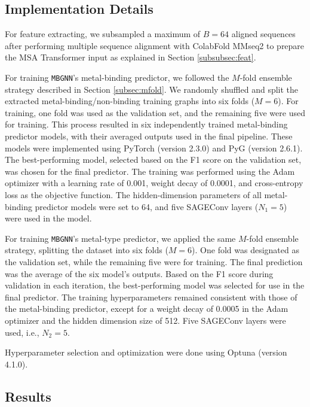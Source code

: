 \documentclass[letterpaper, 10 pt, conference]{ieeeconf}
\begin{document}
\subsection{Implementation Details}
For feature extracting, we subsampled a maximum of $B=64$ aligned sequences after performing multiple sequence alignment with ColabFold MMseq2 to prepare the MSA Transformer input as explained in Section \ref{subsubsec:feat}.

For training \texttt{MBGNN}’s metal-binding predictor, we followed the $M$-fold ensemble strategy described in Section \ref{subsec:mfold}. We randomly shuffled and split the extracted metal-binding/non-binding training graphs into six folds ($M=6$). For training, one fold was used as the validation set, and the remaining five were used for training. This process resulted in six independently trained metal-binding predictor models, with their averaged outputs used in the final pipeline. These models were implemented using PyTorch (version 2.3.0)\cite{10.5555/3454287.3455008} and PyG (version 2.6.1)\cite{fey2019fast}. The best-performing model, selected based on the F1 score on the validation set, was chosen for the final predictor. The training was performed using the Adam optimizer with a learning rate of 0.001, weight decay of 0.0001, and cross-entropy loss as the objective function. The hidden-dimension parameters of all metal-binding predictor models were set to 64, and five SAGEConv layers ($N_1=5$) were used in the model.

For training \texttt{MBGNN}’s metal-type predictor, we applied the same $M$-fold ensemble strategy, splitting the dataset into six folds ($M=6$). One fold was designated as the validation set, while the remaining five were for training. The final prediction was the average of the six model's outputs. Based on the F1 score during validation in each iteration, the best-performing model was selected for use in the final predictor. The training hyperparameters remained consistent with those of the metal-binding predictor, except for a weight decay of 0.0005 in the Adam optimizer and the hidden dimension size of 512. Five SAGEConv layers were used, i.e., $N_2=5$.

Hyperparameter selection and optimization were done using Optuna (version 4.1.0)\cite{akiba2019optuna}.


\subsection{Results}
\label{subsec:res}
\end{document}
